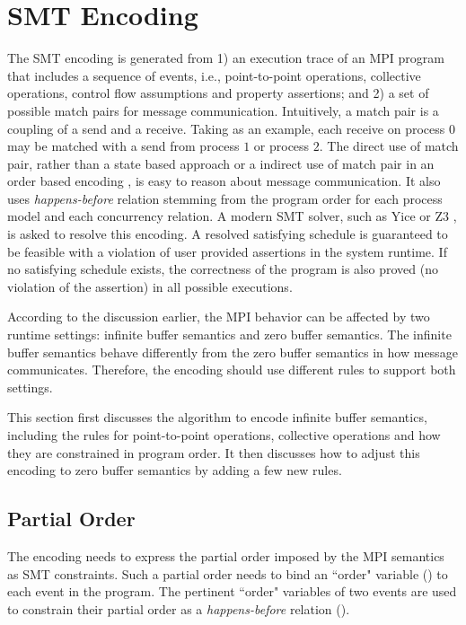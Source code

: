 \section{SMT Encoding}
The SMT encoding is generated from 1) an execution trace of an MPI program that includes a sequence of events, i.e., point-to-point operations, collective operations, control flow assumptions and property assertions; and 2) a set of possible match pairs for message communication. Intuitively, a match pair is a coupling of a send and a receive. Taking  as an example, each receive on process $0$ may be matched with a send from process $1$ or process $2$. The direct use of match pair, rather than a state based approach \cite{elwakil:padtad10} or a indirect use of match pair in an order based encoding \cite{elwakil:atva10}, is easy to reason about message communication. It also uses \textit{happens-before} relation stemming from the program order for each process model and each concurrency relation. A modern SMT solver, such as Yice \cite{dutertre:CAV06} or Z3 \cite{demoura:tacas08}, is asked to resolve this encoding. A resolved satisfying schedule is guaranteed to be feasible with a violation of user provided assertions in the system runtime. If no satisfying schedule exists, the correctness of the program is also proved (no violation of the assertion) in all possible executions. 

According to the discussion earlier, the MPI behavior can be affected by two runtime settings: infinite buffer semantics and zero buffer semantics. The infinite buffer semantics behave differently from the zero buffer semantics in how message communicates. Therefore, the encoding should use different rules to support both settings. 

This section first discusses the algorithm to encode infinite buffer semantics, including the rules for point-to-point operations, collective operations and how they are constrained in program order. It then discusses how to adjust this encoding to zero buffer semantics by adding a few new rules.

\subsection{Partial Order}
The encoding needs to express the partial order imposed by the MPI semantics as SMT constraints. Such a partial order needs to bind an ``order" variable () to each event in the program. The pertinent ``order" variables of two events are used to constrain their partial order as a \emph{happens-before} relation ().

